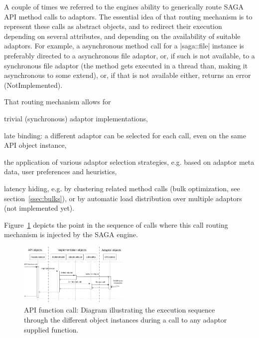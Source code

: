 A couple of times we referred to the engines ability to generically
route SAGA API method calls to adaptors.  The essential idea of that
routing mechanism is to represent these calls as abstract objects, and
to redirect their execution depending on several attributes, and
depending on the availability of suitable adaptors.  For example,
a asynchronous method call for a |saga::file| instance is preferably
directed to a asynchronous file adaptor, or, if such is not available,
to a synchronous file adaptor (the method gets executed in a thread
than, making it asynchronous to some extend), or, if that is not
available either, returns an error (NotImplemented).

\newpage
That routing mechanism allows for 
\begin{shortlist}
   \item trivial (synchronous) adaptor implementations, 
   \item late binding: a different adaptor can be selected
         for each call, even on the same API object instance, 
   \item the application of various adaptor selection strategies, e.g. 
         based on adaptor meta data, user preferences and heuristics, 
   \item latency hiding, e.g. by clustering related method calls (bulk
         optimization, see section~\ref{ssec:bulks}), or by 
         automatic load distribution over multiple adaptors (not 
         implemented yet).
\end{shortlist}

Figure~\ref{fig:object_functioncall} depicts the point in the sequence of calls
where this call routing mechanism is injected by the SAGA engine.

\begin{figure}[!ht]
 \begin{center}
  \includegraphics[width=0.47\textwidth]{images/object_lifetime_functioncall}
  \caption{\label{fig:object_functioncall}
    API function call: Diagram illustrating the execution sequence through 
    the different object instances during a call to any adaptor supplied 
    function.}
 \end{center}
\end{figure}


